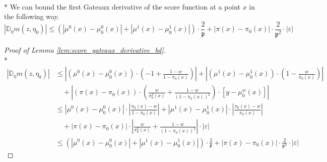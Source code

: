 \begin{boxD}
    \begin{lem}\label{lem:score_gateaux_derivative_bd}\mbox{}\\*
    We can bound the first Gateaux derivative of the score function at a point $x$ in the following way.
    \begin{equation}
        \left| \mathbb{D}_{\eta} m(z, \eta_{0}) \right| \leq \left(\left| \mu^{0}(x) - \mu_{0}^{0}(x) \right| + \left| \mu^{1}(x) - \mu_{0}^{1}(x) \right|\right) \cdot \frac{2}{\mathfrak{p}}
            + \left| \pi(x) - \pi_{0}(x) \right| \cdot \frac{2}{\mathfrak{p}^{2}} \cdot \left| \varepsilon \right|
    \end{equation}
\end{lem}
\end{boxD}

\begin{proof}[Proof of Lemma \ref{lem:score_gateaux_derivative_bd}]\mbox{}\\*
    \begin{equation}
        \begin{aligned}
            \left| \mathbb{D}_{\eta} m(z, \eta_{0}) \right|
            & \leq \left|(\mu^{0}(x) - \mu_{0}^{0}(x)) \cdot \left(-1 + \frac{1 - w}{1 - \pi_{0}(x) }\right)\right|
            + \left| (\mu^{1}(x) - \mu_{0}^{1}(x)) \cdot \left(1 - \frac{w}{\pi_{0}(x)}\right)\right|\\
            & \quad + \left| (\pi(x) - \pi_{0}(x)) \cdot \left(\frac{w}{\pi_{0}^{2}(x)} + \frac{1-w}{\left(1-\pi_{0}(x)\right)^{2}}\right) \cdot \left[y - \mu_{0}^{w}(x)\right]\right| \\
            & \leq \left| \mu^{0}(x) - \mu_{0}^{0}(x) \right| \cdot \left|\frac{\pi_{0}(x) - w}{1 - \pi_{0}(x)}\right|
            + \left| \mu^{1}(x) - \mu_{0}^{1}(x) \right| \cdot \left|\frac{\pi_{0}(x) - w}{\pi_{0}(x)}\right|\\
            & \quad + \left| \pi(x) - \pi_{0}(x) \right| \cdot \left|\frac{w}{\pi_{0}^{2}(x)} + \frac{1-w}{\left(1-\pi_{0}(x)\right)^{2}} \right| \cdot \left| \varepsilon \right| \\
            & \leq \left(\left| \mu^{0}(x) - \mu_{0}^{0}(x) \right| + \left| \mu^{1}(x) - \mu_{0}^{1}(x) \right|\right) \cdot \frac{2}{\mathfrak{p}}
            + \left| \pi(x) - \pi_{0}(x) \right| \cdot \frac{2}{\mathfrak{p}^{2}} \cdot \left| \varepsilon \right|
        \end{aligned}
    \end{equation}
\end{proof}

